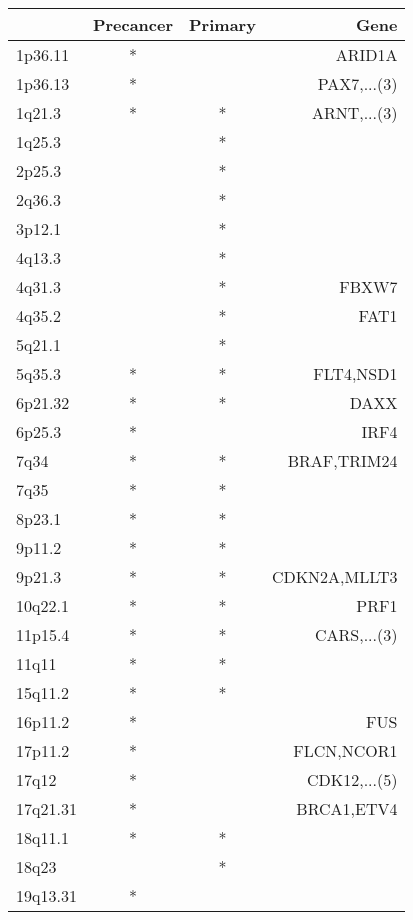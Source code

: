 \begin{tabular}{lccr}
\toprule
{} & Precancer & Primary &          Gene \\
\midrule
1p36.11  &         * &         &        ARID1A \\
1p36.13  &         * &         &   PAX7,...(3) \\
1q21.3   &         * &       * &   ARNT,...(3) \\
1q25.3   &           &       * &               \\
2p25.3   &           &       * &               \\
2q36.3   &           &       * &               \\
3p12.1   &           &       * &               \\
4q13.3   &           &       * &               \\
4q31.3   &           &       * &         FBXW7 \\
4q35.2   &           &       * &          FAT1 \\
5q21.1   &           &       * &               \\
5q35.3   &         * &       * &     FLT4,NSD1 \\
6p21.32  &         * &       * &          DAXX \\
6p25.3   &         * &         &          IRF4 \\
7q34     &         * &       * &   BRAF,TRIM24 \\
7q35     &         * &       * &               \\
8p23.1   &         * &       * &               \\
9p11.2   &         * &       * &               \\
9p21.3   &         * &       * &  CDKN2A,MLLT3 \\
10q22.1  &         * &       * &          PRF1 \\
11p15.4  &         * &       * &   CARS,...(3) \\
11q11    &         * &       * &               \\
15q11.2  &         * &       * &               \\
16p11.2  &         * &         &           FUS \\
17p11.2  &         * &         &    FLCN,NCOR1 \\
17q12    &         * &         &  CDK12,...(5) \\
17q21.31 &         * &         &    BRCA1,ETV4 \\
18q11.1  &         * &       * &               \\
18q23    &           &       * &               \\
19q13.31 &         * &         &               \\
\bottomrule
\end{tabular}
